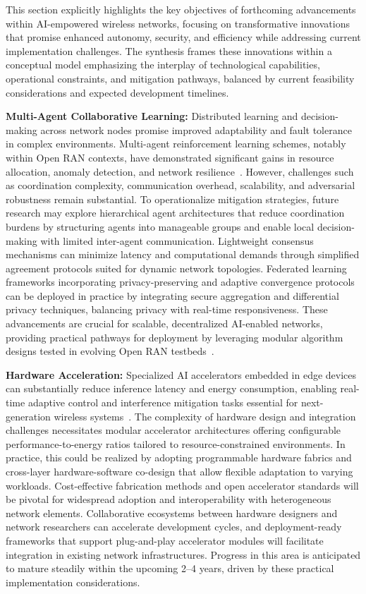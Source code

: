 \documentclass[sigconf]{acmart}
\begin{document}
This section explicitly highlights the key objectives of forthcoming advancements within AI-empowered wireless networks, focusing on transformative innovations that promise enhanced autonomy, security, and efficiency while addressing current implementation challenges. The synthesis frames these innovations within a conceptual model emphasizing the interplay of technological capabilities, operational constraints, and mitigation pathways, balanced by current feasibility considerations and expected development timelines.

\textbf{Multi-Agent Collaborative Learning:} Distributed learning and decision-making across network nodes promise improved adaptability and fault tolerance in complex environments. Multi-agent reinforcement learning schemes, notably within Open RAN contexts, have demonstrated significant gains in resource allocation, anomaly detection, and network resilience~\cite{ref49,ref54}. However, challenges such as coordination complexity, communication overhead, scalability, and adversarial robustness remain substantial. To operationalize mitigation strategies, future research may explore hierarchical agent architectures that reduce coordination burdens by structuring agents into manageable groups and enable local decision-making with limited inter-agent communication. Lightweight consensus mechanisms can minimize latency and computational demands through simplified agreement protocols suited for dynamic network topologies. Federated learning frameworks incorporating privacy-preserving and adaptive convergence protocols can be deployed in practice by integrating secure aggregation and differential privacy techniques, balancing privacy with real-time responsiveness. These advancements are crucial for scalable, decentralized AI-enabled networks, providing practical pathways for deployment by leveraging modular algorithm designs tested in evolving Open RAN testbeds~\cite{ref54}.

\textbf{Hardware Acceleration:} Specialized AI accelerators embedded in edge devices can substantially reduce inference latency and energy consumption, enabling real-time adaptive control and interference mitigation tasks essential for next-generation wireless systems~\cite{ref50}. The complexity of hardware design and integration challenges necessitates modular accelerator architectures offering configurable performance-to-energy ratios tailored to resource-constrained environments. In practice, this could be realized by adopting programmable hardware fabrics and cross-layer hardware-software co-design that allow flexible adaptation to varying workloads. Cost-effective fabrication methods and open accelerator standards will be pivotal for widespread adoption and interoperability with heterogeneous network elements. Collaborative ecosystems between hardware designers and network researchers can accelerate development cycles, and deployment-ready frameworks that support plug-and-play accelerator modules will facilitate integration in existing network infrastructures. Progress in this area is anticipated to mature steadily within the upcoming 2–4 years, driven by these practical implementation considerations.
\end{document}
